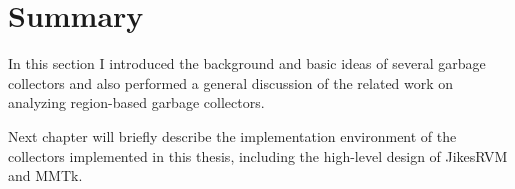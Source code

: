 \section{Summary}

In this section I introduced the background and basic ideas of several garbage collectors and
also performed a general discussion of the related work on analyzing region-based garbage collectors.

Next chapter will briefly describe the implementation environment of the collectors implemented
in this thesis, including the high-level design of JikesRVM and MMTk.
